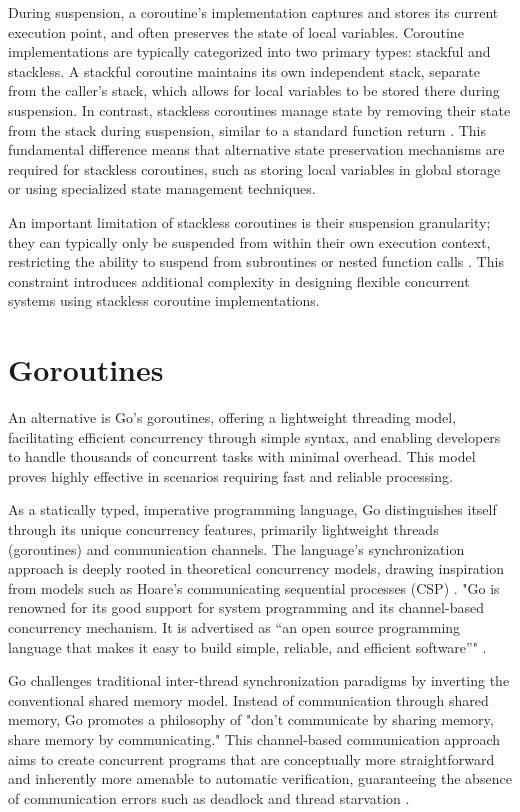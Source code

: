 \documentclass[]{final}
\begin{document}
During suspension, a coroutine's implementation captures and stores
its current execution point, and often preserves the state of local variables.
Coroutine implementations are typically categorized into two primary types:
stackful and stackless. A stackful coroutine maintains its own independent
stack, separate from the caller's stack, which allows for local variables
to be stored there during suspension. In contrast, stackless coroutines
manage state by removing their state from the stack
during suspension, similar to a standard function return \cite{belson_survey_2019}.
This fundamental difference means that alternative state preservation
mechanisms are required for stackless coroutines, such as storing
local variables in global storage or using specialized state management techniques.

An important limitation of stackless coroutines is their suspension granularity;
they can typically only be suspended from within their own execution context,
restricting the ability to suspend from subroutines or nested function calls
\cite{belson_survey_2019}. This constraint introduces additional complexity
in designing flexible concurrent systems using stackless coroutine implementations.

\section{Goroutines}

An alternative is Go’s goroutines, offering a lightweight threading model,
facilitating efficient concurrency through
simple syntax, and enabling developers to handle thousands of concurrent tasks with
minimal overhead. This model proves highly effective in scenarios requiring fast
and reliable processing.

As a statically typed, imperative programming language, Go distinguishes
itself through its unique concurrency features, primarily lightweight threads
(goroutines) and communication channels.
The language's synchronization approach
is deeply rooted in theoretical concurrency models,
drawing inspiration from models such as Hoare's communicating sequential
processes (CSP) \cite{lange_empirical_2019}.
"Go is renowned for its good support for system programming
and its channel-based concurrency mechanism. It is advertised
as “an open source programming
language that makes it easy to build simple, reliable, and
efficient software”" \cite{lange_empirical_2019}.

Go challenges traditional inter-thread synchronization
paradigms by inverting the conventional shared memory model. Instead
of communication through shared memory, Go promotes a philosophy of
"don't communicate by sharing memory, share memory by communicating."
This channel-based communication approach aims to create concurrent programs
that are conceptually more straightforward and inherently more amenable
to automatic verification, guaranteeing
the absence of communication errors such as deadlock and
thread starvation \cite{lange_empirical_2019}.
\end{document}
